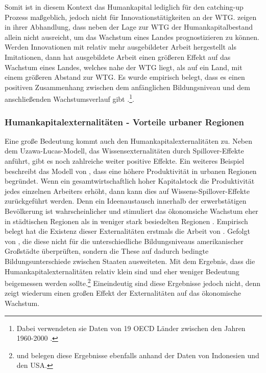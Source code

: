 %
Somit ist in diesem Kontext das Humankapital lediglich für den catching-up Prozess maßgeblich, jedoch nicht für Innovationstätigkeiten an der WTG. \cite{Krueger.2001} zeigen in ihrer Abhandlung, dass neben der Lage zur WTG  der Humankapitalbestand allein nicht ausreicht, um das Wachstum eines Landes prognostizieren zu können.\\
%
Werden Innovationen mit relativ mehr ausgebildeter Arbeit hergestellt als Imitationen, dann hat ausgebildete Arbeit einen größeren Effekt auf das Wachstum eines Landes, welches nahe der WTG liegt, als auf ein Land, mit einem größeren Abstand zur WTG. Es wurde empirisch belegt, dass es einen positiven Zusammenhang zwischen dem anfänglichen Bildungsniveau und dem anschließenden Wachstumsverlauf gibt \cite{Vandenbussche.2006}.\footnote{Dabei verwendeten sie Daten von 19 OECD Länder zwischen den Jahren 1960-2000 \cite{Vandenbussche.2006}.}.
%
\subsubsection*{Humankapitalexternalitäten - Vorteile urbaner Regionen}
Eine große Bedeutung kommt auch den Humankapitalexternalitäten zu. Neben dem Uzawa-Lucas-Modell, das Wissensexternalitäten durch Spillover-Effekte anführt, gibt es noch zahlreiche weiter positive Effekte. Ein weiteres Beispiel beschreibt das Modell von \cite{Jacobs.1970}, dass eine höhere Produktivität in urbanen Regionen begründet.
Wenn ein gesamtwirtschaftlich hoher Kapitalstock die Produktivität jedes einzelnen Arbeiters erhöht, dann kann dies auf Wissens-Spillover-Effekte zurückgeführt werden. Denn ein Ideenaustausch innerhalb der erwerbstätigen Bevölkerung ist wahrscheinlicher und stimuliert das ökonomsiche Wachstum eher in städtischen Regionen als in weniger stark besiedelten Regionen \cite{Azariades.1990,Lucas.1988}. Empirisch belegt hat die Existenz dieser Externalitäten erstmals die Arbeit von \cite{Rauch.}. Gefolgt von \cite{Acemoglu.2000}, die diese nicht für die unterschiedliche Bildungsniveaus amerikanischer Großstädte überprüften, sondern die These auf dadurch bedingte Bildungsunterschiede zwischen Staaten ausweiteten. Mit dem Ergebnis, dass die Humankapitalexternalitäten relativ klein sind und eher weniger Bedeutung beigemessen werden sollte.\footnote{\cite{Duflo.2004} und \cite{Ciccone.Apr} belegen diese Ergebnisse ebenfalls anhand der Daten von Indonesien und den USA.} Eineindeutig sind diese Ergebnisse jedoch nicht, denn \cite{Moretti.2004} zeigt wiederum einen großen Effekt der Externalitäten auf das ökonomische Wachstum.